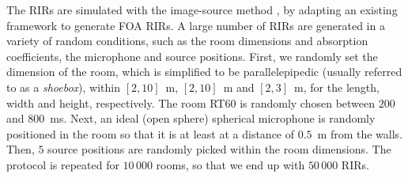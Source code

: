 The RIRs are simulated with the image-source method \cite{allen_image_1979}, by adapting an existing framework \cite{habets_room_2006} to generate FOA RIRs. A large number of RIRs are generated in a variety of random conditions, such as the room dimensions and absorption coefficients, the microphone and source positions. First, we randomly set the dimension of the room, which is simplified to be parallelepipedic (usually referred to as a \textit{shoebox}), within $[2,10]$~m, $[2,10]$~m and $[2,3]$~m, for the length, width and height, respectively. The room RT60 is randomly chosen between $200$ and $800$~ms. Next, an ideal (open sphere) spherical microphone is randomly positioned in the room so that it is at least at a distance of $0.5$~m from the walls. Then, $5$ source positions are randomly picked within the room dimensions. The protocol is repeated for $10\,000$ rooms, so that we end up with $50\,000$ RIRs.

